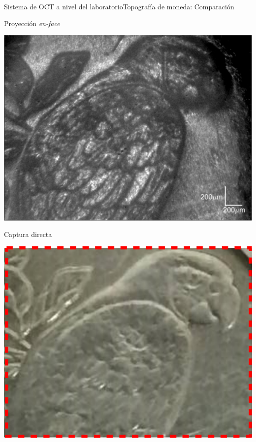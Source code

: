 \documentclass[fleqn,10pt]{beamer}
\begin{document}
\begin{frame}{Sistema de OCT a nivel del laboratorio}{Topografía de moneda: Comparación}
	
	\begin{multicols}{2}
		\centering
		Proyección \emph{en-face}
		
		\includegraphics[width=1\linewidth]{AAUgraphics/pt2/OCT_En_face_Projection}
		\newpage
		
		Captura directa
		
		\includegraphics[width=0.98\linewidth]{AAUgraphics/pt2/Moneda_Directa_img_comparison}
	\end{multicols}
	
\end{frame}
\end{document}
